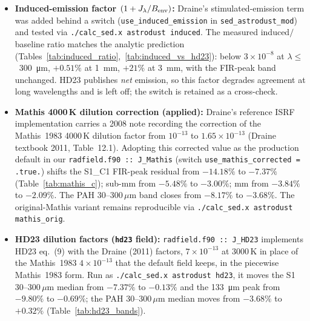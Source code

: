 \documentclass{my_memo}
\newcommand{\Teq}{\ensuremath{T_{\rm eq}}}
\begin{document}
\begin{itemize}
        and feeding it through the full \texttt{sed\_solve} calculation.
        The substitution recovered only $\sim 4$ percentage points of
        the deficit (from $-15.1\%$ to $-11.3\%$ at the FIR peak,
        measured before the enthalpy ghost-bin correction and not
        remeasured, since the driver is not in this tree), with sign
        flips in adjacent bands. The orientation-convention hypothesis
        is rejected because \Teq\ self-consistency dampens the naive
        linear prediction.
  \item \textbf{Induced-emission factor $(1+J_\lambda/B_{\rm env})$:}
        Draine's stimulated-emission term was added behind a switch
        (\texttt{use\_induced\_emission} in \texttt{sed\_astrodust\_mod})
        and tested via \texttt{./calc\_sed.x astrodust induced}. The
        measured induced$/$baseline ratio matches the analytic
        prediction (Tables~\ref{tab:induced_ratio},~\ref{tab:induced_vs_hd23}):
        below $3\times10^{-8}$ at $\lambda \le$~\SI{300}{\micro\meter},
        $+0.51\%$ at \SI{1}{\milli\meter}, $+21\%$ at
        \SI{3}{\milli\meter}, with the FIR-peak band unchanged. HD23
        publishes \emph{net} emission, so this factor degrades
        agreement at long wavelengths and is left off; the switch is
        retained as a cross-check.
  \item \textbf{Mathis 4000\,K dilution correction (applied):}
        Draine's reference ISRF implementation carries a 2008 note
        recording the correction of the Mathis~1983 4000\,K dilution
        factor from $10^{-13}$ to $1.65\times 10^{-13}$ (Draine
        textbook 2011, Table~12.1). Adopting this corrected value as
        the production default in our
        \texttt{radfield.f90~::~J\_Mathis} (switch
        \texttt{use\_mathis\_corrected = .true.}) shifts the S1\_C1
        FIR-peak residual from $-14.18\%$ to $-7.37\%$
        (Table~\ref{tab:mathis_c}); sub-mm from $-5.48\%$ to
        $-3.00\%$; mm from $-3.84\%$ to $-2.09\%$. The PAH
        30--300\,$\mu$m band closes from $-8.17\%$ to $-3.68\%$.
        The original-Mathis variant remains reproducible via
        \texttt{./calc\_sed.x astrodust mathis\_orig}.
  \item \textbf{HD23 dilution factors (\texttt{hd23} field):}
        \texttt{radfield.f90~::~J\_HD23} implements HD23 eq.~(9) with
        the Draine (2011) factors, $7\times10^{-13}$ at 3000\,K in
        place of the Mathis~1983 $4\times10^{-13}$ that the default
        field keeps, in the piecewise Mathis~1983 form. Run as
        \texttt{./calc\_sed.x astrodust hd23}, it moves the S1
        30--300\,$\mu$m median from $-7.37\%$ to $-0.13\%$ and the
        \SI{133}{\micro\meter} peak from $-9.80\%$ to $-0.69\%$; the
        PAH 30--300\,$\mu$m median moves from $-3.68\%$ to $+0.32\%$
        (Table~\ref{tab:hd23_bands}).
\end{itemize}
\end{document}
